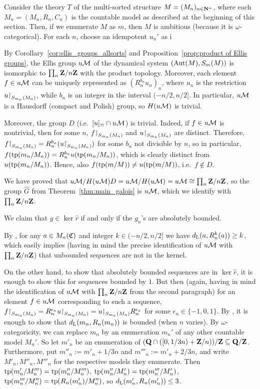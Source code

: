 	
	\begin{ex}
		\label{ex:CLPZ}
		Consider the theory $T$ of the multi-sorted structure $M=(M_n)_{n\in {\mathbf{N}}^+}$, where each $M_n=(M_n,R_n,C_n)$ is the countable model as described at the beginning of this section. Then, if we enumerate $M$ as $m$, then $M$ is ambitious (because it is $\omega$-categorical). For each $n$, choose an idempotent $u_n'$ as i
		
		By Corollary~\ref{cor:ellis_groups_allsorts} and Proposition~\ref{prop:product of Ellis groups}, the Ellis group $u{\mathcal M}$ of  the dynamical system $(\operatorname{{Aut}}(M),S_m(M))$ is isomorphic to $\prod_n {\mathbf{Z}}/n{\mathbf{Z}}$ with the product topology. Moreover, each element $f\in u{\mathcal M}$ can be uniquely represented as $(R_n^{b_n}u_n)_n$, where $u_n$ is the restriction $u\mathord{\upharpoonright}_{S_{m_n}(M_n)}$, while $b_n$ is an integer in the interval $(-n/2,n/2]$. In particular, $u{\mathcal M}$ is a Hausdorff (compact and Polish) group, so $H(u{\mathcal M})$ is trivial.
		
		Moreover, the group $D$ (i.e.\ $[u]_\equiv\cap u{\mathcal M}$) is trivial. Indeed, if $f\in u{\mathcal M}$ is nontrivial, then for some $n$, $f\mathord{\upharpoonright}_{S_{m_n}(M_n)}$ and $u\mathord{\upharpoonright}_{S_{m_n}(M_n)}$ are distinct. Therefore, $f\mathord{\upharpoonright}_{S_{m_n}(M_n)}=R_n^{b_n}(u\mathord{\upharpoonright}_{S_{m_n}(M_n)})$ for some $b_n$ not divisible by $n$, so in particular, $f(\operatorname{{tp}}(m_n/M_n))=R_n^{b_n}u(\operatorname{{tp}}(m_n/M_n))$, which is clearly distinct from $u(\operatorname{{tp}}(m_n/M_n))$. Hence, also $f(\operatorname{{tp}}(m/M))\neq u(\operatorname{{tp}}(m/M))$, i.e.\ $f\notin D$.
		
		We have proved that $u{\mathcal M}/H(u{\mathcal M})D=u{\mathcal M}/H(u{\mathcal M})=u{\mathcal M} \cong \prod_n {\mathbf{Z}}/n{\mathbf{Z}}$, so the group $\hat G$ from Theorem~\ref{thm:main_galois} is $u{\mathcal M}$, which we identify with $\prod_n {\mathbf{Z}}/n{\mathbf{Z}}$.
		
		We claim that $g\in \ker \hat r$ if and only if the $g_n$'s are absolutely bounded.
		
		By \cite[Corollary~4.3]{CLPZ01}, for any $a\in M_n({\mathfrak C})$ and integer $k \in (-n/2,n/2]$ we have $d_{\mathrm{L}}(a,R_n^k(a)) \geq k$, which easily implies (having in mind the precise identification of $u{\mathcal M}$ with $\prod_n {\mathbf{Z}}/n{\mathbf{Z}}$) that unbounded sequences are not in the kernel.
		
		On the other hand, to show that absolutely bounded sequences are in $\ker \hat r$, it is enough to show this for sequences bounded by $1$. But then (again, having in mind the identification of $u{\mathcal M}$ with $\prod_n {\mathbf{Z}}/n{\mathbf{Z}}$ from the second paragraph) for an element $f \in u{\mathcal M}$ corresponding to such a sequence, $f\mathord{\upharpoonright}_{S_{m_n}(M_n)} =R_n^{\epsilon_n}u \mathord{\upharpoonright}_{S_{m_n}(M_n)}=u \mathord{\upharpoonright}_{S_{m_n}(M_n)}R_n^{\epsilon_n}$ for some $\epsilon_n \in \{-1,0,1\}$. By \cite[Lemma 3.7]{CLPZ01}, it is enough to show that $d_{\mathrm{L}}(m_n,R_n(m_n))$ is bounded (when $n$ varies).
		By $\omega$-categoricity, we can replace $m_n$ by an enumeration $m_n'$ of any other countable model $M_n'$. So let $m'_n$ be an enumeration of $({\mathbf{Q}}\cap ([0,1/3n)+{\mathbf{Z}}/n ))/{\mathbf{Z}}\subseteq {\mathbf{Q}}/{\mathbf{Z}}$. Furthermore, put $m''_n:=m'_n+1/3n$ and $m'''_n:=m'_n+2/3n$, and write $M'_n,M''_n,M'''_n$ for the respective models they enumerate. Then $\operatorname{{tp}}(m'_n/M'''_n)=\operatorname{{tp}}(m''_n/M'''_n)$, $\operatorname{{tp}}(m''_n/M'_n)=\operatorname{{tp}}(m'''_n/M'_n)$, $\operatorname{{tp}}(m'''_n/M''_n)=\operatorname{{tp}}(R_n(m'_n)/M''_n)$, so $d_{\mathrm{L}}(m_n',R_n(m_n')) \leq 3$.
		

\end{ex}
